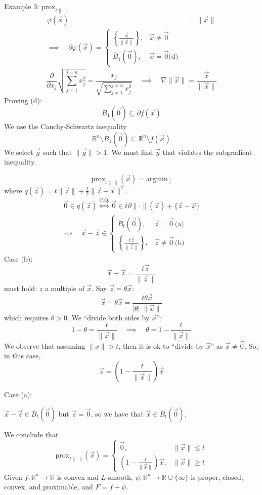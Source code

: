\documentclass{article}
\newcommand{\R}{\mathbb{R}}             %
\newcommand{\x}{\vec{x}}                %
\newcommand{\y}{\vec{y}}                %
\newcommand{\z}{\vec{z}}                %
\begin{document}
Example 3: $\text{prox}_{t \|\cdot\|}$
\begin{align*}
    \varphi(\x) &= \|\x\| \\
    \implies \quad \partial \varphi(\x) = \begin{cases}
        \left\{\frac{\x}{\|\x\|}\right\}, & \x \neq \vec{0} \\
        \overline{B}_1\left(\vec{0}\right), & \vec{x} = \vec{0} \text{(d)}
    \end{cases}
\end{align*}
\[
    \frac{\partial}{\partial x_j} \sqrt{\sum_{j = 1}^{j = n} x_j^2} = \frac{x_j}{\sqrt{\sum_{j = 1}^{j = n} x_j^2}} \quad \implies \quad \nabla \|\x\| = \frac{\x}{\|\x\|}
\]
Proving (d):
\[
    \overline{B}_1\left(\vec{0}\right) \subseteq \partial f(\x)
\]
We use the Cauchy-Schwartz inequality
\[
    \R^n \setminus \overline{B}_1\left(\vec{0}\right) \subseteq \R^n \setminus f(\x)
\]
We select $\vec{g}$ such that $\|\vec{g}\| > 1$. We must find $\y$ that violates the subgradient inequality.

\[
    \text{prox}_{t \|\cdot\|}(\x) = \text{argmin}_{\z}
\]
where $q(\z) = t\|\z\| + \frac{1}{2}\|\z - \x\|^2$.
\begin{align*}
    \vec{0} \in q(\z) \overset{\text{C.Q.}}{\iff} \vec{0} \in t\partial \|\cdot\|(\z) + \{\z - \x\} \\
    \iff \quad \x - \z \in \begin{cases}
        \overline{B}_t\left(\vec{0}\right), & \z = \vec{0}\, \text{(a)} \\
        \left\{\frac{t\z}{\|\z\|}\right\}, & \z \neq \vec{0}\, \text{(b)}
    \end{cases}
\end{align*}
Case (b):
\[
    \x - \z = \frac{t\z}{\|\z\|}
\]
must hold: $z$ a multiple of $\x$. Say $\z = \theta\x$:
\[
    \x - \theta\x = \frac{t\theta\x}{|\theta| \cdot \|\x\|}
\]
which requires $\theta > 0$. We ``divide both sides by $\x$'':
\[
    1 - \theta = \frac{t}{\|\x\|} \quad \implies \quad \theta = 1 - \frac{t}{\|\x\|}
\]
We observe that assuming $\|x\| > t$, then it is ok to ``divide by $\x$'' as $\x \neq \vec{0}$. So, in this case,
\[
    \z = \left(1 - \frac{t}{\|\x\|}\right)\x
\]

Case (a):

$\x - \z \in \overline{B}_t\left(\vec{0}\right)$ but $\z = \vec{0}$, so we have that $\x \in \overline{B}_t\left(\vec{0}\right)$.

We conclude that
\[
    \text{prox}_{t \|\cdot\|}(\x) = \begin{cases}
        \vec{0}, & \|\x\| \leq t \\
        \left(1 - \frac{t}{\|\x\|}\right)\x, & \|\x\| \geq t
    \end{cases}
\]
Given $f \colon \R^n \to \R$ is convex and $L$-smooth, $\psi \colon \R^n \to \R \cup \{\infty\}$ is proper, closed, convex, and proximable, and $F = f + \psi$.
\end{document}

